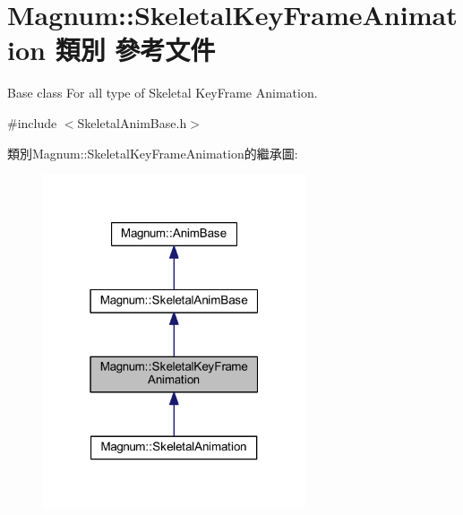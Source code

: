 \hypertarget{class_magnum_1_1_skeletal_key_frame_animation}{}\section{Magnum\+:\+:Skeletal\+Key\+Frame\+Animation 類別 參考文件}
\label{class_magnum_1_1_skeletal_key_frame_animation}


Base class For all type of Skeletal Key\+Frame Animation.  




{\ttfamily \#include $<$Skeletal\+Anim\+Base.\+h$>$}



類別\+Magnum\+:\+:Skeletal\+Key\+Frame\+Animation的繼承圖\+:\nopagebreak
\begin{figure}[H]
\begin{center}
\leavevmode
\includegraphics[width=220pt]{class_magnum_1_1_skeletal_key_frame_animation__inherit__graph}
\end{center}
\end{figure}


